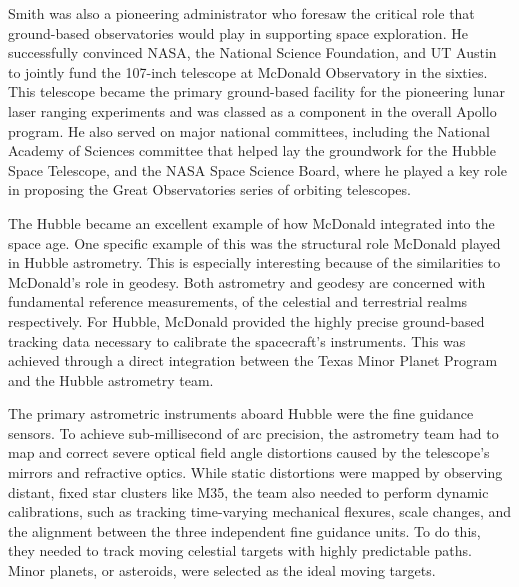 Smith was also a pioneering administrator who foresaw the critical role that ground-based observatories would play in supporting space exploration. He successfully convinced NASA, the National Science Foundation, and UT Austin to jointly fund the 107-inch telescope at McDonald Observatory in the sixties. This telescope became the primary ground-based facility for the pioneering lunar laser ranging experiments and was classed as a component in the overall Apollo program. He also served on major national committees, including the National Academy of Sciences committee that helped lay the groundwork for the Hubble Space Telescope, and the NASA Space Science Board, where he played a key role in proposing the Great Observatories series of orbiting telescopes. 

The Hubble became an excellent example of how McDonald integrated into the space age. One specific example of this was the structural role McDonald played in Hubble astrometry. This is especially interesting because of the similarities to McDonald’s role in geodesy. Both astrometry and geodesy are concerned with fundamental reference measurements, of the celestial and terrestrial realms respectively. For Hubble, McDonald provided the highly precise ground-based tracking data necessary to calibrate the spacecraft's instruments. This was achieved through a direct integration between the Texas Minor Planet Program and the Hubble astrometry team.

The primary astrometric instruments aboard Hubble were the fine guidance sensors. To achieve sub-millisecond of arc precision, the astrometry team had to map and correct severe optical field angle distortions caused by the telescope's mirrors and refractive optics. While static distortions were mapped by observing distant, fixed star clusters like M35, the team also needed to perform dynamic calibrations, such as tracking time-varying mechanical flexures, scale changes, and the alignment between the three independent fine guidance units. To do this, they needed to track moving celestial targets with highly predictable paths. Minor planets, or asteroids, were selected as the ideal moving targets.


